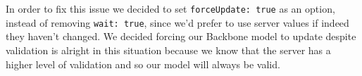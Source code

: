 In order to fix this issue we decided to set \verb!forceUpdate: true! as an option, instead of removing \verb!wait: true!, since we'd prefer to use server values if indeed they haven't changed. We decided forcing our Backbone model to update despite validation is alright in this situation because we know that the server has a higher level of validation and so our model will always be valid.

